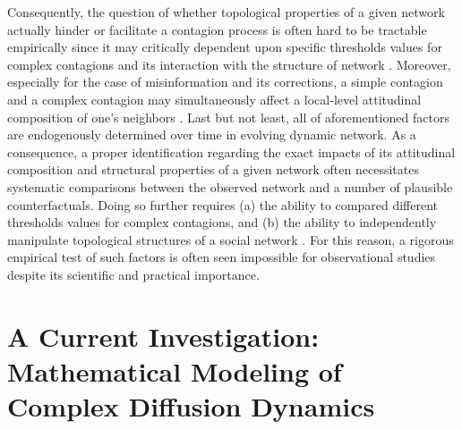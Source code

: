 \documentclass[man, 12pt, a4paper, nolmodern, noextraspace]{apa6}
\begin{document}
    Consequently, the question of whether topological properties of a given network actually hinder or facilitate a contagion process is often hard to be tractable empirically since it may critically dependent upon specific thresholds values for complex contagions and its interaction with the structure of network \parencite[e.g.,][]{Centola2007449}. Moreover, especially for the case of misinformation and its corrections, a simple contagion and a complex contagion may simultaneously affect a local-level attitudinal composition of one's neighbors \parencite[i.e., those who endorse and believe misinformation vs. those who do not: e.g.,][]{campbell2013complex}. Last but not least, all of aforementioned factors are endogenously determined over time in evolving dynamic network. As a consequence, a proper identification regarding the exact impacts of its attitudinal composition and structural properties of a given network often necessitates systematic comparisons between the observed network and a number of plausible counterfactuals. Doing so further requires (a) the ability to compared different thresholds values for complex contagions, and (b) the ability to independently manipulate topological structures of a social network \parencite[e.g.,][]{Centola2010Sience, gonzalez2017decoding}. For this reason, a rigorous empirical test of such factors is often seen impossible for observational studies despite its scientific and practical importance.
    
\section{A Current Investigation: Mathematical Modeling of Complex Diffusion Dynamics} 
\end{document}
